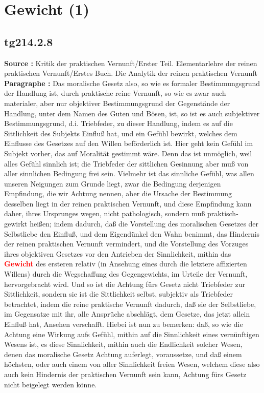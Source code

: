 \documentclass[a4paper,12pt,twoside]{book}
\newcommand{\match}[1]{\textcolor{red}{\textbf{#1}}}
\newcommand{\unnumberedsection}[1]{
	\section*{#1}
	\addcontentsline{toc}{section}{#1}
	\markright{#1}
}
\begin{document}
	\unnumberedsection{Gewicht (1)} 
	\subsection*{tg214.2.8} 
	\textbf{Source : }Kritik der praktischen Vernunft/Erster Teil. Elementarlehre der reinen praktischen Vernunft/Erstes Buch. Die Analytik der reinen praktischen Vernunft\\  
	
	\noindent\textbf{Paragraphe : }
	Das moralische Gesetz also, so wie es formaler Bestimmungsgrund der Handlung ist, durch praktische reine Vernunft, so wie es zwar auch materialer, aber nur objektiver Bestimmungsgrund der Gegenstände der Handlung, unter dem Namen des Guten und Bösen, ist, so ist es auch subjektiver Bestimmungsgrund, d.i. Triebfeder, zu dieser Handlung, indem es auf die Sittlichkeit des Subjekts Einfluß hat, und ein Gefühl bewirkt, welches dem Einflusse des Gesetzes auf den Willen beförderlich ist. Hier geht kein Gefühl im Subjekt vorher, das auf Moralität gestimmt wäre. Denn das ist unmöglich, weil alles Gefühl sinnlich ist; die Triebfeder der sittlichen Gesinnung aber muß von aller sinnlichen Bedingung frei sein. Vielmehr ist das sinnliche Gefühl, was allen unseren Neigungen zum Grunde liegt, zwar die Bedingung derjenigen Empfindung, die wir Achtung nennen, aber die Ursache der Bestimmung desselben liegt in der reinen praktischen Vernunft, und diese Empfindung kann daher, ihres Ursprunges wegen, nicht pathologisch, sondern muß praktisch-gewirkt heißen; indem dadurch, daß die Vorstellung des moralischen Gesetzes der Selbstliebe den Einfluß, und dem Eigendünkel den Wahn benimmt, das Hindernis der reinen praktischen Vernunft vermindert, und die Vorstellung des Vorzuges ihres objektiven Gesetzes vor den Antrieben der Sinnlichkeit, mithin das \match{Gewicht} des ersteren relativ (in Ansehung eines durch die letztere affizierten Willens) durch die Wegschaffung des Gegengewichts, im Urteile der Vernunft, hervorgebracht wird. Und so ist die Achtung fürs Gesetz nicht Triebfeder zur Sittlichkeit, sondern sie ist die Sittlichkeit selbst, subjektiv als Triebfeder betrachtet, indem die reine praktische Vernunft dadurch, daß sie der Selbstliebe, im Gegensatze mit ihr, alle Ansprüche abschlägt, dem Gesetze, das jetzt allein Einfluß hat, Ansehen verschafft. Hiebei ist nun zu bemerken: daß, so wie die Achtung eine Wirkung aufs Gefühl, mithin auf die Sinnlichkeit eines vernünftigen Wesens ist, es diese Sinnlichkeit, mithin auch die Endlichkeit solcher Wesen, denen das moralische Gesetz Achtung auferlegt, voraussetze, und  daß einem höchsten, oder auch einem von aller Sinnlichkeit freien Wesen, welchem diese also auch kein Hindernis der praktischen Vernunft sein kann, Achtung fürs Gesetz nicht beigelegt werden könne. 
	
\end{document}
